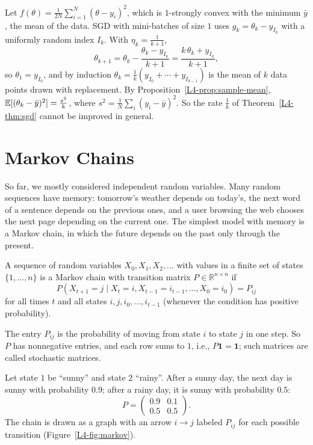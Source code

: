 \begin{example}\label{L4-ex:sgd-mean}
    Let $f(\theta) = \frac{1}{2N}\sum_{i=1}^N (\theta - y_i)^2$, which is $1$-strongly convex with the minimum $\bar y$, the mean of the data. SGD with mini-batches of size $1$ uses $g_k = \theta_k - y_{I_k}$ with a uniformly random index $I_k$. With $\eta_k = \frac{1}{k + 1}$,
    \[\theta_{k+1} = \theta_k - \frac{\theta_k - y_{I_k}}{k + 1} = \frac{k\,\theta_k + y_{I_k}}{k + 1},\]
    so $\theta_1 = y_{I_0}$, and by induction $\theta_k = \frac{1}{k}(y_{I_0} + \cdots + y_{I_{k-1}})$ is the mean of $k$ data points drawn with replacement. By Proposition~\ref{L4-prop:sample-mean}, $\mathbb{E}[(\theta_k - \bar y)^2] = \frac{s^2}{k}$, where $s^2 = \frac{1}{N}\sum_i (y_i - \bar y)^2$. So the rate $\frac{1}{k}$ of Theorem~\ref{L4-thm:sgd} cannot be improved in general.
\end{example}

\section{Markov Chains}\label{L4-sec:markov}

So far, we mostly considered independent random variables. Many random sequences have memory: tomorrow's weather depends on today's, the next word of a sentence depends on the previous ones, and a user browsing the web chooses the next page depending on the current one. The simplest model with memory is a Markov chain, in which the future depends on the past only through the present.

\begin{definition}\label{L4-def:markov}
    A sequence of random variables $X_0, X_1, X_2, \ldots$ with values in a finite set of states $\{1, \ldots, n\}$ is a Markov chain with transition matrix $P \in \mathbb{R}^{n \times n}$ if
    \[P(X_{t+1} = j \mid X_t = i, X_{t-1} = i_{t-1}, \ldots, X_0 = i_0) = P_{ij}\]
    for all times $t$ and all states $i, j, i_0, \ldots, i_{t-1}$ (whenever the condition has positive probability).
\end{definition}

The entry $P_{ij}$ is the probability of moving from state $i$ to state $j$ in one step. So $P$ has nonnegative entries, and each row sums to $1$, i.e., $P\mathbf{1} = \mathbf{1}$; such matrices are called stochastic matrices.

\begin{example}[Weather]\label{L4-ex:weather}
    Let state $1$ be ``sunny'' and state $2$ ``rainy''. After a sunny day, the next day is sunny with probability $0.9$; after a rainy day, it is sunny with probability $0.5$:
    \[P = \begin{pmatrix} 0.9 & 0.1 \\ 0.5 & 0.5 \end{pmatrix}.\]
    The chain is drawn as a graph with an arrow $i \to j$ labeled $P_{ij}$ for each possible transition (Figure~\ref{L4-fig:markov}).
\end{example}


